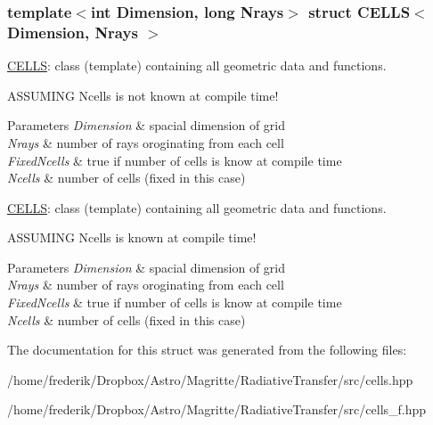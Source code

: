 \subsubsection*{template$<$int Dimension, long Nrays$>$\newline
struct C\+E\+L\+L\+S$<$ Dimension, Nrays $>$}

\mbox{\hyperlink{structCELLS}{C\+E\+L\+LS}}\+: class (template) containing all geometric data and functions.
\begin{DoxyItemize}
\item A\+S\+S\+U\+M\+I\+NG Ncells is not known at compile time! 
\begin{DoxyParams}{Parameters}
{\em Dimension} & spacial dimension of grid \\
\hline
{\em Nrays} & number of rays oroginating from each cell \\
\hline
{\em Fixed\+Ncells} & true if number of cells is know at compile time \\
\hline
{\em Ncells} & number of cells (fixed in this case)\\
\hline
\end{DoxyParams}
\mbox{\hyperlink{structCELLS}{C\+E\+L\+LS}}\+: class (template) containing all geometric data and functions.
\item A\+S\+S\+U\+M\+I\+NG Ncells is known at compile time! 
\begin{DoxyParams}{Parameters}
{\em Dimension} & spacial dimension of grid \\
\hline
{\em Nrays} & number of rays oroginating from each cell \\
\hline
{\em Fixed\+Ncells} & true if number of cells is know at compile time \\
\hline
{\em Ncells} & number of cells (fixed in this case) \\
\hline
\end{DoxyParams}

\end{DoxyItemize}

The documentation for this struct was generated from the following files\+:\begin{DoxyCompactItemize}
\item 
/home/frederik/\+Dropbox/\+Astro/\+Magritte/\+Radiative\+Transfer/src/cells.\+hpp\item 
/home/frederik/\+Dropbox/\+Astro/\+Magritte/\+Radiative\+Transfer/src/cells\+\_\+f.\+hpp\end{DoxyCompactItemize}
